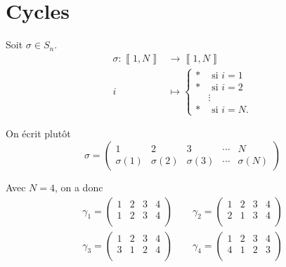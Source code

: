 \part{Cycles}

\begin{rmk}
	[Notation]
	Soit $\sigma \in S_n$.
	\begin{align*}
		\sigma: \left\llbracket 1,N \right\rrbracket &\longrightarrow \left\llbracket 1,N \right\rrbracket \\
		i &\longmapsto \begin{cases}
			* &\text{ si } i = 1\\
			* &\text{ si } i =2\\
						&\vdots\\
			* &\text{ si } i = N.
		\end{cases}
	\end{align*}

	On écrit plutôt \[
		\sigma = \begin{pmatrix}
			1&2&3&\cdots&N\\
			\sigma(1)&\sigma(2)&\sigma(3)&\cdots&\sigma(N)
		\end{pmatrix}
	\]
\end{rmk}

\begin{exm}
	Avec $N = 4$, on a donc
	\begin{align*}
		\gamma_1 = \begin{pmatrix}
			1&2&3&4\\
			1&2&3&4\\
		\end{pmatrix} \qquad
		\gamma_2 = \begin{pmatrix}
			1&2&3&4\\
			2&1&3&4\\
		\end{pmatrix} \\[3mm]
		\gamma_3 = \begin{pmatrix}
			1&2&3&4\\
			3&1&2&4\\
		\end{pmatrix} \qquad
		\gamma_4 = \begin{pmatrix}
			1&2&3&4\\
			4&1&2&3\\
		\end{pmatrix} 
	\end{align*}
\end{exm}

